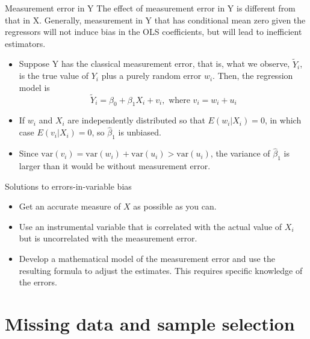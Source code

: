\documentclass[presentation,10pt]{beamer}
\newcommand{\var}{\mathrm{var}}
\begin{document}
\begin{frame}[label={sec:orgbc1fb09}]{Measurement error in Y}
The effect of measurement error in Y is different from that in
X. Generally, measurement in Y that has conditional mean zero given
the regressors will not induce bias in the OLS coefficients, but will
lead to inefficient estimators. 

\begin{itemize}
\item Suppose Y has the classical measurement error, that is, what we
observe, \(\tilde{Y}_i\), is the true value of \(Y_i\) plus a purely
random error \(w_i\). Then, the regression model is 
\[ \tilde{Y}_i = \beta_0 + \beta_1 X_i + v_i, \text{ where } v_i = w_i +
  u_i\]
\item If \(w_i\) and \(X_i\) are independently distributed so that \(E(w_i | X_i)
  = 0\), in which case \(E(v_i | X_i) = 0\), so \(\hat{\beta}_1\) is
unbiased.
\item Since \(\var(v_i) = \var(w_i) + \var(u_i) > \var(u_i)\), the variance
of \(\hat{\beta}_1\) is larger than it would be without measurement
error.
\end{itemize}
\end{frame}

\begin{frame}[label={sec:org4057f8b}]{Solutions to errors-in-variable bias}
\begin{itemize}
\item Get an accurate measure of \(X\) as possible as you can.
\item Use an instrumental variable that is correlated with the actual
value of \(X_i\) but is uncorrelated with the measurement error.
\item Develop a mathematical model of the measurement error and use the
resulting formula to adjust the estimates. This requires specific
knowledge of the errors.
\end{itemize}
\end{frame}

\section{Missing data and sample selection}
\label{sec:orgc3ed249}
\end{document}
